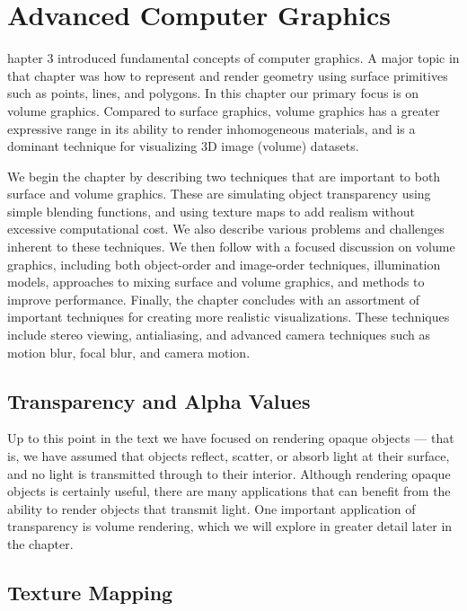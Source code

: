 \chapter{Advanced Computer Graphics}
\label{chap:advanced_computer_graphics}

	hapter 3 introduced fundamental concepts of computer graphics.
	A major topic in that chapter was how to represent and render geometry using surface primitives such as points, lines, and polygons.
	In this chapter our primary focus is on volume graphics.
	Compared to surface graphics, volume graphics has a greater expressive range in its ability to render inhomogeneous materials, and is a dominant technique for visualizing 3D image (volume) datasets.
	
	We begin the chapter by describing two techniques that are important to both surface and volume graphics.
	These are simulating object transparency using simple blending functions, and using texture maps to add realism without excessive computational cost.
	We also describe various problems and challenges inherent to these techniques.
	We then follow with a focused discussion on volume graphics, including both object-order and image-order techniques, illumination models, approaches to mixing surface and volume graphics, and methods to improve performance.
	Finally, the chapter concludes with an assortment of important techniques for creating more realistic visualizations.
	These techniques include stereo viewing, antialiasing, and advanced camera techniques such as motion blur, focal blur, and camera motion.

\section{Transparency and Alpha Values}

	Up to this point in the text we have focused on rendering opaque objects — that is, we have assumed that objects reflect, scatter, or absorb light at their surface, and no light is transmitted through to their interior. Although rendering opaque objects is certainly useful, there are many applications that can benefit from the ability to render objects that transmit light. One important
	application of transparency is volume rendering, which we will explore in greater detail later in the chapter.

\section{Texture Mapping}

